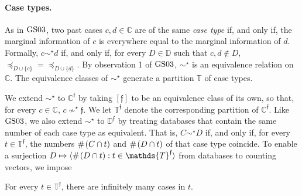 \documentclass[12pt,a4paper,twoside]{article}
\newcommand{\gsii}{$\textup{GS03}$}
\newcommand{\novel}{\mathfrak f}
\newcommand{\preceqb}{\mathbin{\preceq}}
\newcommand{\countof}{\mathbin{\#}\hskip1pt}
\newcommand{\mbbd}{{\mathds D}}
\newcommand{\mbbdp}{{\mathds D^{\novel}}}
\newcommand{\mbbc}{{\mathds C}}
\newcommand{\mbbcp}{{\mathds C^{\novel}}}
\newcommand{\mbbt}{{\mathds {T}}}
\newcommand{\mbbtp}{{\mathds{T}^\novel}}
\begin{document}



\paragraph{Case types.}\hskip-5pt As in \gsii, two past cases $c , d \in \mbbc$
are of the same \emph{case type} if, and only if, the marginal information of
$c$ is everywhere equal to the marginal information of $d$. Formally, $c \sim
^{\star} d$ if, and only if, for every $D \in \mbbd$ such that $c , d \notin
D$, $\preceqb _ {D \cup \{c \}} = \preceqb _ {D \cup \{d \}}$.  By
observation 1 of \gsii, $\sim^{\star}$ is an equivalence relation on
$\mbbc$. The equivalence classes of $\sim^\star$ generate a partition $\mbbt$
of case types.

We extend $\sim^{\star}$ to $\mbbcp$ by taking $[ \novel ]$ to be an
equivalence class of its own, so that, for every $c \in \mbbc$, $c \nsim^{
  \star} \novel$.  We let $\mbbtp$ denote the corresponding partition of
$\mbbcp$.  Like \gsii, we also extend $\sim^{\star}$ to $\mbbdp$ by treating
databases that contain the same number of each case type as equivalent. That
is, $C \sim^{\star} D$ if, and only if, for every $t \in \mbbtp$, the numbers
$\countof (C \cap t)$ and $\countof (D \cap t)$ of that case type coincide. To
enable a surjection $D \mapsto \langle\countof (D \cap t): t \in \mbbtp \rangle$
from databases to counting vectors, we impose



\begin{assumption*}
For every  $t \in \mbbtp$, there are infinitely many cases in $t$.
\end{assumption*}

\end{document}
